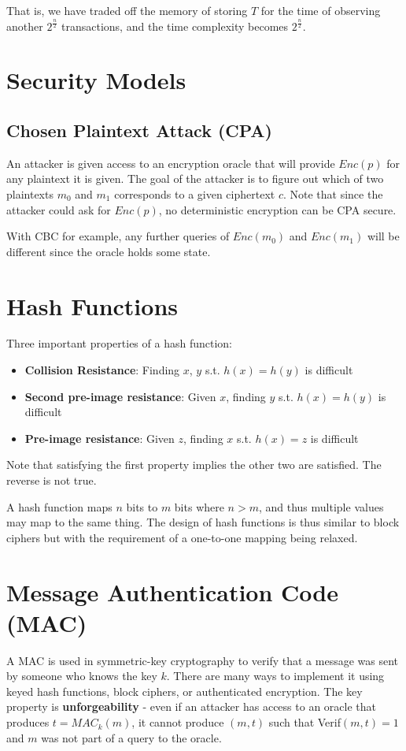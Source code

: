\documentclass[11pt]{report}
\begin{document}
That is, we have traded off the memory of storing $T$ for the time of observing another $2^{\frac{n}{2}}$ transactions, and the time complexity becomes $2^{\frac{n}{2}}$.

\section{Security Models}
\subsection{Chosen Plaintext Attack (CPA)}
An attacker is given access to an encryption oracle that will provide $Enc(p)$ for any plaintext it is given. The goal of the attacker is to figure out which of two plaintexts $m_0$ and $m_1$ corresponds to a given ciphertext $c$. Note that since the attacker could ask for $Enc(p)$, no deterministic encryption can be CPA secure.

With CBC for example, any further queries of $Enc(m_0)$ and $Enc(m_1)$ will be different since the oracle holds some state.

\section{Hash Functions}
Three important properties of a hash function:

\begin{itemize}
	\item \textbf{Collision Resistance}: Finding $x$, $y$ s.t. $h(x) = h(y)$ is difficult
	\item \textbf{Second pre-image resistance}: Given $x$, finding $y$ s.t. $h(x) = h(y)$ is difficult
	\item \textbf{Pre-image resistance}: Given $z$, finding $x$ s.t. $h(x) = z$ is difficult
\end{itemize}

Note that satisfying the first property implies the other two are satisfied. The reverse is not true.

A hash function maps $n$ bits to $m$ bits where $n > m$, and thus multiple values may map to the same thing. The design of hash functions is thus similar to block ciphers but with the requirement of a one-to-one mapping being relaxed.


\section{Message Authentication Code (MAC)}
A MAC is used in symmetric-key cryptography to verify that a message was sent by someone who knows the key $k$. There are many ways to implement it using keyed hash functions, block ciphers, or authenticated encryption. The key property is \textbf{unforgeability} - even if an attacker has access to an oracle that produces $t = MAC_{k}(m)$, it cannot produce $(m, t)$ such that Verif$(m,t) = 1$ and $m$ was not part of a query to the oracle.
\end{document}
